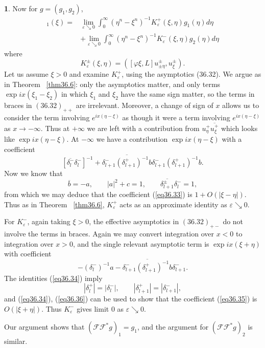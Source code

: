 \documentclass{surv-l}
\theoremstyle{plain}
\theoremstyle{definition}
\newtheorem*{sop}{\sc{Sketch of Proof}}
\numberwithin{equation}{chapter}
\begin{document}
\begin{sop}
Now for $g =(g_{1},g_{2})$,
\begin{align*}
[2\pi \mathscr{F}\!\!\mathscr{F}^{*}g]_{1}(\xi)=&\lim_{\varepsilon\searrow 0}\int_{0}^{\infty}(\eta^{n}-\xi^{n})^{-1}K_{\varepsilon}^{+}(\xi,\eta)g_{1}(\eta)d\eta\\
&+\lim_{\varepsilon\searrow0}\int_{0}^{\infty}(\eta^{n}-\xi^{n})^{-1}K_{\varepsilon}^{-}(\xi, \eta)g_{2}(\eta)d\eta
\end{align*}
where
\begin{equation*}
K_{\varepsilon}^{\pm}(\xi, \eta)=([\varphi\xi,L]u_{\pm\eta}^{\pm},u_{\xi}^{\pm}).
\end{equation*}
Let us assume $\xi>0$ and examine $K_{\varepsilon}^{+}$, using the asymptotics (36.32). We argue as in Theorem ~\ref{thm36.6}: only the asymptotics matter, and only terms $\exp ix(\xi_{1}-\xi_{2})$ in which $\xi_{1}$ and $\xi_{2}$ have the same sign matter, so the terms in braces in $(36.32)_{++}$ are irrelevant. Moreover, a change of sign of $x$ allows us to consider the term involving $e^{ix(\eta-\xi)}$ as though it were a term involving $e^{ix(\eta-\xi)}$ as $ x\rightarrow-\infty$. Thus at $+\infty$ we are left with a contribution from $u_{\eta}^{+}\overline{u_{\xi}^{+}}$ which looks like $\exp ix(\eta-\xi)$. At $-\infty$ we have a contribution $\exp ix(\eta-\xi)$ with a coefficient
\setcounter{equation}{32}
\begin{equation}\label{eq36.33} [\overline{\delta_{l}^{-}}\delta_{l}^{-}]^{-1}+\overline{\delta_{l+1}^{-}(\delta_{l+1}^{+})^{-1}b}\delta_{l+1}^{-}(\delta_{l+1}^{+})^{-1}b.
\end{equation}
Now we know that
\begin{equation}\label{eq36.34}
\overline{b}=-a,\qquad |a|^{2}+c=1,\qquad \overline{\delta_{l+1}^{\pm}}\delta_{l}^{-}=1,
\end{equation}
from which we may deduce that the coefficient (\ref{eq36.33}) is $1+O(|\xi-\eta|)$. Thus as in Theorem ~\ref{thm36.6}, $K_{\varepsilon}^{+}$ acts as an approximate identity as $\varepsilon\searrow 0$.

For $K_{\varepsilon}^{-}$, again taking $\xi>0$, the effective asymptotics in $(36.32)_{+-}$ do not involve the terms in braces. Again we may convert integration over $x<0$ to integration over $x>0$, and the single relevant asymptotic term is $\exp ix(\xi+\eta)$ with coefficient
\begin{equation}\label{eq36.35}
-(\delta_{l}^{-})^{-1}a-\overline{\delta_{l+1}^{-}(\delta_{l+1}^{+})^{-1}b}\delta_{l+1}^{-}.
\end{equation}
The identities (\ref{eq36.34}) imply
\begin{equation}\label{eq36.36}
|\delta_{l}^{+}|=|\delta_{l}^{-}|,\qquad|\delta_{l+1}^{+}|=|\delta_{l+1}^{-}|,
\end{equation}
and (\ref{eq36.34}), (\ref{eq36.36}) can be used to show that the coefficient (\ref{eq36.35}) is $O(|\xi+\eta|)$. Thus $K_{\varepsilon}^{-}$ gives limit $0$ as $\varepsilon\searrow 0$.

Our argument shows that $(\mathscr{F}\!\!\mathscr{F}^{*}g)_{1}=g_{1}$, and the argument for $(\mathscr{F}\!\!\mathscr{F}^{*}g)_{2}$ is similar.
\end{sop}
\end{document}
